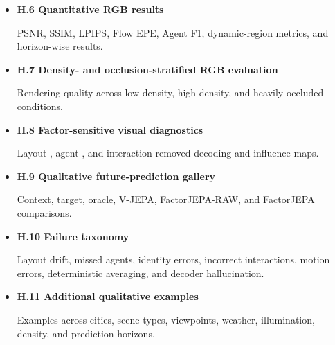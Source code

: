 \begin{itemize}
\begin{itemize}
    \item \textbf{H.6 Quantitative RGB results}
    
    PSNR, SSIM, LPIPS, Flow EPE, Agent F1, dynamic-region metrics, and
    horizon-wise results.

    \item \textbf{H.7 Density- and occlusion-stratified RGB evaluation}
    
    Rendering quality across low-density, high-density, and heavily
    occluded conditions.

    \item \textbf{H.8 Factor-sensitive visual diagnostics}
    
    Layout-, agent-, and interaction-removed decoding and influence
    maps.

    \item \textbf{H.9 Qualitative future-prediction gallery}
    
    Context, target, oracle, V-JEPA, FactorJEPA-RAW, and FactorJEPA
    comparisons.

    \item \textbf{H.10 Failure taxonomy}
    
    Layout drift, missed agents, identity errors, incorrect
    interactions, motion errors, deterministic averaging, and decoder
    hallucination.

    \item \textbf{H.11 Additional qualitative examples}
    
    Examples across cities, scene types, viewpoints, weather,
    illumination, density, and prediction horizons.
\end{itemize}

\end{itemize}





































